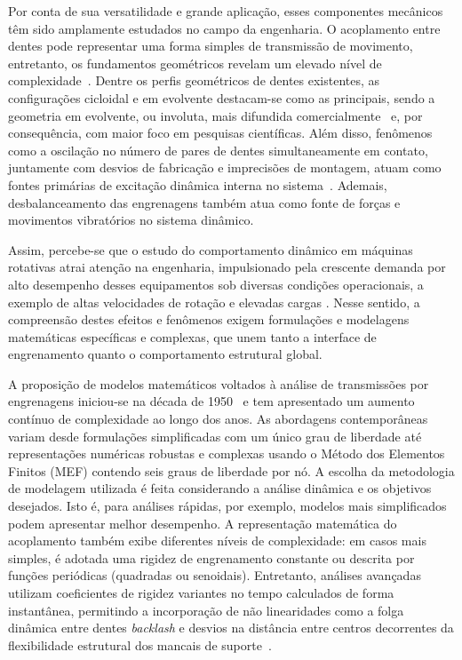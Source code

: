 Por conta de sua versatilidade e grande aplicação, esses componentes mecânicos têm sido amplamente estudados no campo da engenharia. O acoplamento entre dentes pode representar uma forma simples de transmissão de movimento, entretanto, os fundamentos geométricos revelam um elevado nível de complexidade~\cite{colbourne1987}. Dentre os perfis geométricos de dentes existentes, as configurações cicloidal e em evolvente destacam-se como as principais, sendo a geometria em evolvente, ou involuta, mais difundida comercialmente~\cite{flores2015} e, por consequência, com maior foco em pesquisas científicas. Além disso, fenômenos como a oscilação no número de pares de dentes simultaneamente em contato, juntamente com desvios de fabricação e imprecisões de montagem, atuam como fontes primárias de excitação dinâmica interna no sistema~\cite{wan2014}. Ademais, desbalanceamento das engrenagens também atua como fonte de forças e movimentos vibratórios no sistema dinâmico.

Assim, percebe-se que o estudo do comportamento dinâmico em máquinas rotativas atrai atenção na engenharia, impulsionado pela crescente demanda por alto desempenho desses equipamentos sob diversas condições operacionais, a exemplo de altas velocidades de rotação e elevadas cargas \cite{russo1999}. 
Nesse sentido, a compreensão destes efeitos e fenômenos exigem formulações e modelagens matemáticas específicas e complexas, que unem tanto a interface de engrenamento quanto o comportamento estrutural global. 

A proposição de modelos matemáticos voltados à análise de transmissões por engrenagens iniciou-se na década de 1950~\cite{ozguven1988} e tem apresentado um aumento contínuo de complexidade ao longo dos anos. As abordagens contemporâneas variam desde formulações simplificadas com um único grau de liberdade até representações numéricas robustas e complexas usando o Método dos Elementos Finitos (MEF) contendo seis graus de liberdade por nó. A escolha da metodologia de modelagem utilizada é feita considerando a análise dinâmica e os objetivos desejados. Isto é, para análises rápidas, por exemplo, modelos mais simplificados podem apresentar melhor desempenho. A representação matemática do acoplamento também exibe diferentes níveis de complexidade: em casos mais simples, é adotada uma rigidez de engrenamento constante ou descrita por funções periódicas (quadradas ou senoidais). Entretanto, análises avançadas utilizam coeficientes de rigidez variantes no tempo calculados de forma instantânea, permitindo a incorporação de não linearidades como a folga dinâmica entre dentes \textit{backlash} e desvios na distância entre centros decorrentes da flexibilidade estrutural dos mancais de suporte~\cite{yi2019}.

